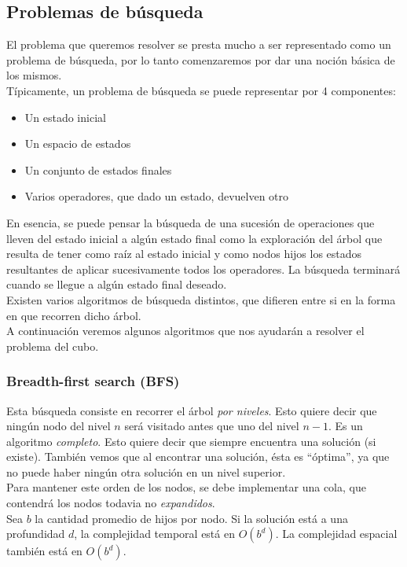 \documentclass[11pt,a4paper]{article}
\begin{document}
\subsection{Problemas de búsqueda}
El problema que queremos resolver se presta mucho a ser representado como un problema de búsqueda, por lo tanto comenzaremos por dar una noción básica de los mismos. \\
Típicamente, un problema de búsqueda se puede representar por 4 componentes:
\begin{itemize}
\item Un estado inicial
\item Un espacio de estados
\item Un conjunto de estados finales
\item Varios operadores, que dado un estado, devuelven otro
\end{itemize}
En esencia, se puede pensar la búsqueda de una sucesión de operaciones que lleven del estado inicial a algún estado final como la exploración del árbol que resulta de tener como raíz al estado inicial y como nodos hijos los estados resultantes de aplicar sucesivamente todos los operadores. La búsqueda terminará cuando se llegue a algún estado final deseado.\\

Existen varios algoritmos de búsqueda distintos, que difieren entre si en la forma en que recorren dicho árbol.\\

A continuación veremos algunos algoritmos que nos ayudarán a resolver el problema del cubo.
\subsubsection{Breadth-first search (BFS)}
Esta búsqueda consiste en recorrer el árbol \emph{por niveles}. Esto quiere decir que ningún nodo del nivel $n$ será visitado antes que uno del nivel $n-1$.
Es un algoritmo \emph{completo}. Esto quiere decir que siempre encuentra una solución (si existe). También vemos que al encontrar una solución, ésta es ``óptima'', ya que no puede haber ningún otra solución en un nivel superior. \\

Para mantener este orden de los nodos, se debe implementar una cola, que contendrá los nodos todavia no \emph{expandidos}. \\

Sea $b$ la cantidad promedio de hijos por nodo. Si la solución está a una profundidad $d$, la complejidad temporal está en $O(b^d)$. La complejidad espacial también está en $O(b^d)$. \\  %
\end{document}
